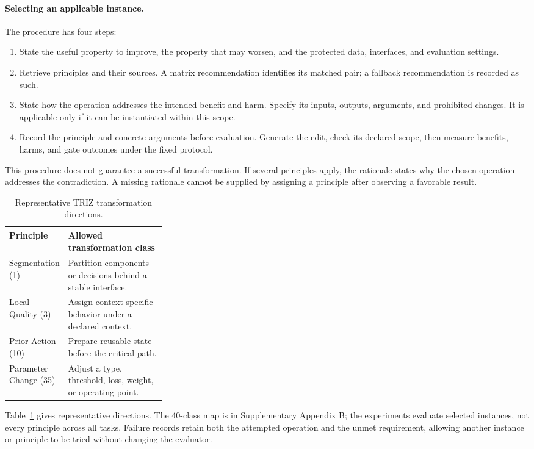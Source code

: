 \documentclass[sigconf]{acmart}
\begin{document}
\paragraph{Selecting an applicable instance.}
The procedure has four steps:
\begin{enumerate}
\item State the useful property to improve, the property that may worsen,
and the protected data, interfaces, and evaluation settings.
\item Retrieve principles and their sources. A matrix recommendation
identifies its matched pair; a fallback recommendation is recorded as such.
\item State how the operation addresses the intended benefit and harm.
Specify its inputs, outputs, arguments, and prohibited changes.
It is applicable only if it can be instantiated within this scope.
\item Record the principle and concrete arguments before evaluation.
Generate the edit, check its declared scope, then measure benefits,
harms, and gate outcomes under the fixed protocol.
\end{enumerate}
This procedure does not guarantee a successful transformation. If several
principles apply, the rationale states why the chosen operation addresses
the contradiction. A missing rationale cannot be supplied by assigning a
principle after observing a favorable result.

\begin{table}[t]
\caption{Representative TRIZ transformation directions.}
\label{tab:mapping}
\centering
\begin{tabularx}{\linewidth}{>{\raggedright\arraybackslash}p{0.30\linewidth}>{\raggedright\arraybackslash}X}
\toprule
\textbf{Principle} & \textbf{Allowed transformation class} \\
\midrule
Segmentation (1) & Partition components or decisions behind a stable interface. \\
Local Quality (3) & Assign context-specific behavior under a declared context. \\
Prior Action (10) & Prepare reusable state before the critical path. \\
Parameter Change (35) & Adjust a type, threshold, loss, weight, or operating point. \\
\bottomrule
\end{tabularx}
\end{table}

Table~\ref{tab:mapping} gives representative directions. The 40-class map
is in Supplementary Appendix B; the experiments evaluate selected
instances, not every principle across all tasks. Failure records retain
both the attempted operation and the unmet requirement, allowing another
instance or principle to be tried without changing the evaluator.
\end{document}

